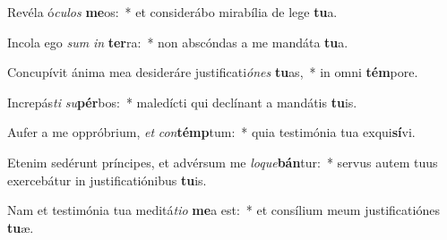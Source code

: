 \item Revéla ó\textit{cu}\textit{los} \textbf{me}os:~* et considerábo mirabília de lege \textbf{tu}a.
\item Incola ego \textit{sum} \textit{in} \textbf{ter}ra:~* non abscóndas a me mandáta \textbf{tu}a.
\item Concupívit ánima mea desideráre justificati\textit{ó}\textit{nes} \textbf{tu}as,~* in omni \textbf{tém}pore.
\item Increpás\textit{ti} \textit{su}\textbf{pér}bos:~* maledícti qui declínant a mandátis \textbf{tu}is.
\item Aufer a me oppróbrium, \textit{et} \textit{con}\textbf{témp}tum:~* quia testimónia tua exqui\textbf{sí}vi.
\item Etenim sedérunt príncipes, et advérsum me \textit{lo}\textit{que}\textbf{bán}tur:~* servus autem tuus exercebátur in justificatiónibus \textbf{tu}is.
\item Nam et testimónia tua meditá\textit{ti}\textit{o} \textbf{me}a est:~* et consílium meum justificatiónes \textbf{tu}æ.
